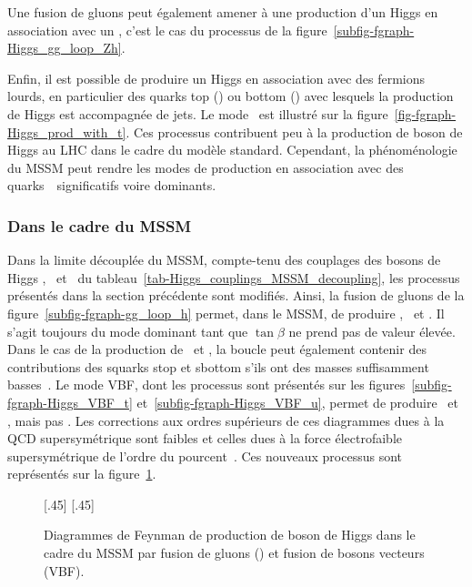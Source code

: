 Une fusion de gluons peut également amener à une production d'un Higgs en association avec un \Zboson, c'est le cas du processus de la figure~\ref{subfig-fgraph-Higgs_gg_loop_Zh}.
\par Enfin, il est possible de produire un Higgs en association avec des fermions lourds, en particulier des quarks top (\ttbar\higgs) ou bottom (\quarkb\antiquarkb\higgs) avec lesquels la production de Higgs est accompagnée de jets.
Le mode \ttbar\higgs\ est illustré sur la figure~\ref{fig-fgraph-Higgs_prod_with_t}.
Ces processus contribuent peu à la production de boson de Higgs au LHC dans le cadre du modèle standard.
Cependant, la phénoménologie du MSSM peut rendre les modes de production en association avec des quarks~\quarkb\ significatifs voire dominants.
\subsubsection{Dans le cadre du MSSM}\label{chapter-MS-MSSM-section-pheno_Higgs_MSSM-subsec-production-MSSM}
Dans la limite découplée du MSSM, compte-tenu des couplages des bosons de Higgs \higgs, \Higgs\ et \HiggsA\ du tableau~\ref{tab-Higgs_couplings_MSSM_decoupling}, les processus présentés dans la section précédente sont modifiés.
Ainsi, la fusion de gluons de la figure~\ref{subfig-fgraph-gg_loop_h} permet, dans le MSSM, de produire \higgs, \Higgs\ et \HiggsA.
Il s'agit toujours du mode dominant tant que $\tan\beta$ ne prend pas de valeur élevée.
Dans le cas de la production de \higgs\ et \Higgs, la boucle peut également contenir des contributions des squarks stop et sbottom s'ils ont des masses suffisamment basses~\cite{Dawson_1996}.
Le mode VBF, dont les processus sont présentés sur les figures~\ref{subfig-fgraph-Higgs_VBF_t} et~\ref{subfig-fgraph-Higgs_VBF_u}, permet de produire \higgs\ et \Higgs, mais pas \HiggsA.
Les corrections aux ordres supérieurs de ces diagrammes dues à la QCD supersymétrique sont faibles et celles dues à la force électrofaible supersymétrique de l'ordre du pourcent~\cite{Higgs_xsec_book_1}.
Ces nouveaux processus sont représentés sur la figure~\ref{fig-fgraph-Higgs_prod_ggh_VBF-MSSM}.
\begin{figure}[h]
\centering
\vspace{\baselineskip}
[.45\textwidth]
{\vspace{\baselineskip}}
\hfill
{}[.45\textwidth]
{\vspace{\baselineskip}}
\caption[Production de boson de Higgs du MSSM par fusion de gluons et de bosons vecteurs.]{Diagrammes de Feynman de production de boson de Higgs dans le cadre du MSSM par fusion de gluons (\gluon\gluon\Higgs) et fusion de bosons vecteurs (VBF).}
\label{fig-fgraph-Higgs_prod_ggh_VBF-MSSM}
\end{figure}
